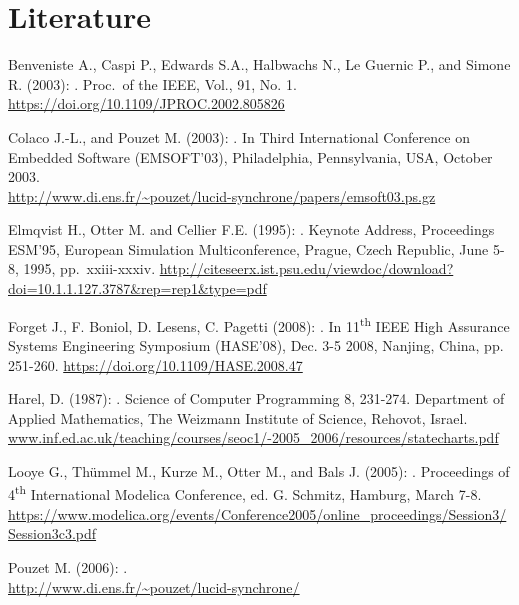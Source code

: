 \chapter{Literature}\label{literature}

Benveniste A., Caspi P., Edwards S.A., Halbwachs N., Le Guernic P., and Simone R. (2003):
.
Proc.\ of the IEEE, Vol., 91, No. 1.
\url{https://doi.org/10.1109/JPROC.2002.805826}

Colaco J.-L., and Pouzet M. (2003):
.
In Third International Conference on Embedded Software (EMSOFT'03), Philadelphia, Pennsylvania, USA, October 2003.\\
\url{http://www.di.ens.fr/~pouzet/lucid-synchrone/papers/emsoft03.ps.gz}

Elmqvist H., Otter M. and Cellier F.E. (1995):
.
Keynote Address, Proceedings ESM'95, European Simulation Multiconference, Prague, Czech Republic, June 5-8, 1995, pp.\ xxiii-xxxiv.
\url{http://citeseerx.ist.psu.edu/viewdoc/download?doi=10.1.1.127.3787\&rep=rep1\&type=pdf}

Forget J., F. Boniol, D. Lesens, C. Pagetti (2008):
.
In 11\textsuperscript{th} IEEE High Assurance Systems Engineering Symposium (HASE'08), Dec. 3-5 2008, Nanjing, China, pp. 251-260.
\url{https://doi.org/10.1109/HASE.2008.47}

Harel, D. (1987):
.
Science of Computer Programming 8, 231-274. Department of Applied Mathematics, The Weizmann Institute of Science, Rehovot, Israel.
\href{http://www.inf.ed.ac.uk/teaching/courses/seoc1/2005_2006/resources/statecharts.pdf}{www.inf.ed.ac.uk/teaching/courses/seoc1/-2005\_2006/resources/statecharts.pdf}

Looye G., Thümmel M., Kurze M., Otter M., and Bals J. (2005):
.
Proceedings of 4\textsuperscript{th} International Modelica Conference, ed. G. Schmitz, Hamburg, March 7-8.\\
\url{https://www.modelica.org/events/Conference2005/online_proceedings/Session3/Session3c3.pdf}

Pouzet M. (2006):
.\\
\url{http://www.di.ens.fr/~pouzet/lucid-synchrone/}
